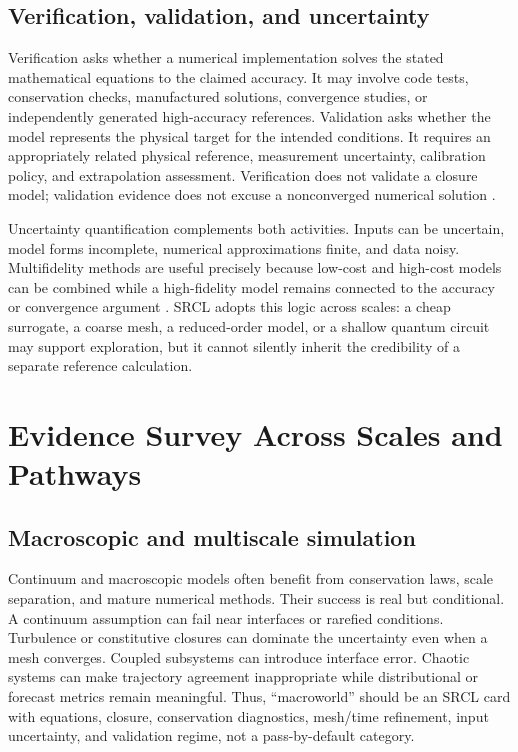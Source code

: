 \documentclass[conference]{../../../../Conference-LaTeX-template_10-17-19/IEEEtran}
\begin{document}
\subsection{Verification, validation, and uncertainty}
Verification asks whether a numerical implementation solves the stated mathematical equations to the claimed accuracy. It may involve code tests, conservation checks, manufactured solutions, convergence studies, or independently generated high-accuracy references. Validation asks whether the model represents the physical target for the intended conditions. It requires an appropriately related physical reference, measurement uncertainty, calibration policy, and extrapolation assessment. Verification does not validate a closure model; validation evidence does not excuse a nonconverged numerical solution \cite{oberkampf_trucano2002,oberkampf_trucano2007}.

Uncertainty quantification complements both activities. Inputs can be uncertain, model forms incomplete, numerical approximations finite, and data noisy. Multifidelity methods are useful precisely because low-cost and high-cost models can be combined while a high-fidelity model remains connected to the accuracy or convergence argument \cite{peherstorfer2018}. SRCL adopts this logic across scales: a cheap surrogate, a coarse mesh, a reduced-order model, or a shallow quantum circuit may support exploration, but it cannot silently inherit the credibility of a separate reference calculation.

\section{Evidence Survey Across Scales and Pathways}
\subsection{Macroscopic and multiscale simulation}
Continuum and macroscopic models often benefit from conservation laws, scale separation, and mature numerical methods. Their success is real but conditional. A continuum assumption can fail near interfaces or rarefied conditions. Turbulence or constitutive closures can dominate the uncertainty even when a mesh converges. Coupled subsystems can introduce interface error. Chaotic systems can make trajectory agreement inappropriate while distributional or forecast metrics remain meaningful. Thus, ``macroworld'' should be an SRCL card with equations, closure, conservation diagnostics, mesh/time refinement, input uncertainty, and validation regime, not a pass-by-default category.
\end{document}
